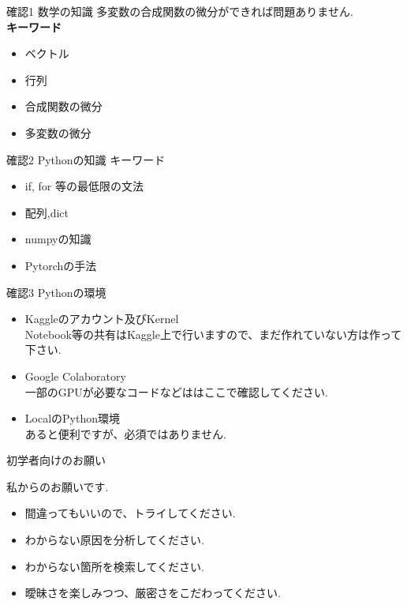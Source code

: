 \begin{frame}{確認1 数学の知識}
多変数の合成関数の微分ができれば問題ありません. \\

\textbf{キーワード}
\begin{itemize}
  \item ベクトル
  \item 行列
  \item 合成関数の微分
  \item 多変数の微分
\end{itemize}
\end{frame}


\begin{frame}{確認2 Pythonの知識}
キーワード
\begin{itemize}
  \item if, for 等の最低限の文法
  \item 配列,dict
  \item numpyの知識
  \item Pytorchの手法
\end{itemize}
\end{frame}


\begin{frame}{確認3 Pythonの環境}
\begin{itemize}
    \item Kaggleのアカウント及びKernel \\
    Notebook等の共有はKaggle上で行いますので、まだ作れていない方は作って下さい.
    \item Google Colaboratory \\
    一部のGPUが必要なコードなどははここで確認してください.
    \item LocalのPython環境 \\
    あると便利ですが、必須ではありません.
\end{itemize}
\end{frame}


\begin{frame}{初学者向けのお願い}

私からのお願いです.
\begin{itemize}
\item 間違ってもいいので、トライしてください.
\item わからない原因を分析してください.
\item わからない箇所を検索してください.
\item 曖昧さを楽しみつつ、厳密さをこだわってください.
\end{itemize}
\end{frame}



